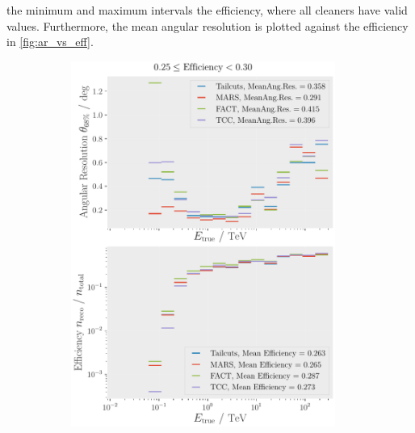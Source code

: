 the minimum and maximum intervals \wrt the efficiency, where all cleaners have valid values.
Furthermore, the mean angular resolution is plotted against the efficiency in \autoref{fig:ar_vs_eff}.
\begin{figure}
    \centering
    \begin{subfigure}{0.48\textwidth}
        \centering
        \includegraphics[width=0.95\textwidth]{plots/ar_aeff/AR_Aeff_MST_0.25_0.30.pdf}
    \end{subfigure}
    \hfill
    \begin{subfigure}{0.48\textwidth}
        \centering

\end{subfigure}
\end{figure}
